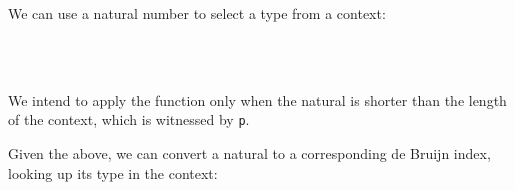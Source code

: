 We can use a natural number to select a type from a context:

\begin{fence}
\begin{code}%
\>[0]\AgdaSpace{}%
\AgdaSymbol{:}\AgdaSpace{}%
\AgdaSymbol{\{}\AgdaSpace{}%
\AgdaSymbol{:}\AgdaSpace{}%
\AgdaSymbol{\}}\AgdaSpace{}%
\AgdaSpace{}%
\AgdaSymbol{\{}\AgdaSpace{}%
\AgdaSymbol{:}\AgdaSpace{}%
\AgdaSymbol{\}}\AgdaSpace{}%
\AgdaSpace{}%
\AgdaSymbol{(}\AgdaSpace{}%
\AgdaSymbol{:}\AgdaSpace{}%
\AgdaSpace{}%
\AgdaOperator{\AgdaFunction{<}}\AgdaSpace{}%
\AgdaSpace{}%
\AgdaSymbol{)}\AgdaSpace{}%
\AgdaSpace{}%
\<%
\\
\>[0]\AgdaSpace{}%
\AgdaSymbol{\{(\AgdaUnderscore{}}\AgdaSpace{}%
\AgdaOperator{\AgdaInductiveConstructor{,}}\AgdaSpace{}%
\AgdaSymbol{)\}}\AgdaSpace{}%
\AgdaSymbol{\{}\AgdaSymbol{\}}%
\>[27]\AgdaSymbol{(}\AgdaSpace{}%
\AgdaSymbol{)}%
\>[38]\AgdaSymbol{=}%
\>[41]\<%
\\
\>[0]\AgdaSpace{}%
\AgdaSymbol{\{(}\AgdaSpace{}%
\AgdaOperator{\AgdaInductiveConstructor{,}}\AgdaSpace{}%
\AgdaSymbol{\AgdaUnderscore{})\}}\AgdaSpace{}%
\AgdaSymbol{\{(}\AgdaSpace{}%
\AgdaSymbol{)\}}\AgdaSpace{}%
\AgdaSymbol{(}\AgdaSpace{}%
\AgdaSymbol{)}%
\>[38]\AgdaSymbol{=}%
\>[41]\AgdaSpace{}%
\<%
\end{code}
\end{fence}

We intend to apply the function only when the natural is shorter than
the length of the context, which is witnessed by \texttt{p}.

Given the above, we can convert a natural to a corresponding de Bruijn
index, looking up its type in the context:

